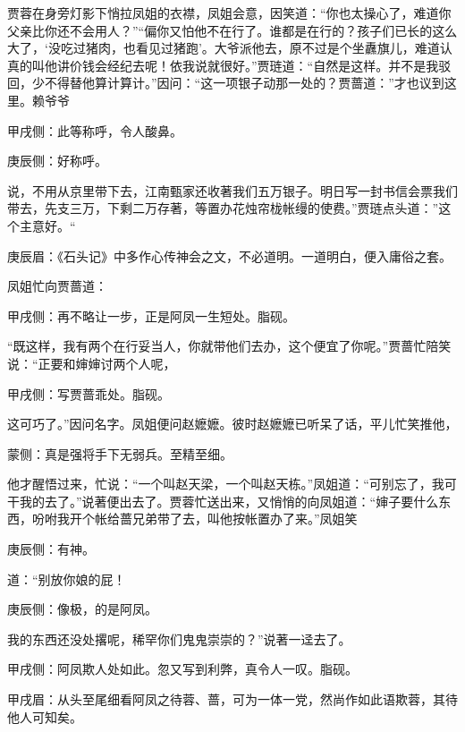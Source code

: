 \begin{parag}
    贾蓉在身旁灯影下悄拉凤姐的衣襟，凤姐会意，因笑道：“你也太操心了，难道你父亲比你还不会用人？”“偏你又怕他不在行了。谁都是在行的？孩子们已长的这么大了，‘没吃过猪肉，也看见过猪跑’。大爷派他去，原不过是个坐纛旗儿，难道认真的叫他讲价钱会经纪去呢！依我说就很好。”贾琏道：“自然是这样。并不是我驳回，少不得替他算计算计。”因问：“这一项银子动那一处的？贾蔷道：”才也议到这里。赖爷爷\begin{note}甲戌侧：此等称呼，令人酸鼻。\end{note}\begin{note}庚辰侧：好称呼。\end{note}说，不用从京里带下去，江南甄家还收著我们五万银子。明日写一封书信会票我们带去，先支三万，下剩二万存著，等置办花烛帘栊帐缦的使费。”贾琏点头道：”这个主意好。“\begin{note}庚辰眉：《石头记》中多作心传神会之文，不必道明。一道明白，便入庸俗之套。\end{note}
\end{parag}


\begin{parag}
    凤姐忙向贾蔷道：\begin{note}甲戌侧：再不略让一步，正是阿凤一生短处。脂砚。\end{note}“既这样，我有两个在行妥当人，你就带他们去办，这个便宜了你呢。”贾蔷忙陪笑说：“正要和婶婶讨两个人呢，\begin{note}甲戌侧：写贾蔷乖处。脂砚。\end{note}这可巧了。”因问名字。凤姐便问赵嬷嬷。彼时赵嬷嬷已听呆了话，平儿忙笑推他，\begin{note}蒙侧：真是强将手下无弱兵。至精至细。\end{note}他才醒悟过来，忙说：“一个叫赵天梁，一个叫赵天栋。”凤姐道：“可别忘了，我可干我的去了。”说著便出去了。贾蓉忙送出来，又悄悄的向凤姐道：“婶子要什么东西，吩咐我开个帐给蔷兄弟带了去，叫他按帐置办了来。”凤姐笑\begin{note}庚辰侧：有神。\end{note}道：“别放你娘的屁！\begin{note}庚辰侧：像极，的是阿凤。\end{note}我的东西还没处撂呢，稀罕你们鬼鬼崇崇的？”说著一迳去了。\begin{note}甲戌侧：阿凤欺人处如此。忽又写到利弊，真令人一叹。脂砚。\end{note}\begin{note}甲戌眉：从头至尾细看阿凤之待蓉、蔷，可为一体一党，然尚作如此语欺蓉，其待他人可知矣。\end{note}
\end{parag}


